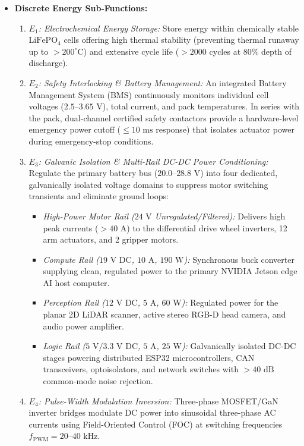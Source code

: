 \begin{itemize}[leftmargin=1.5em]
  \item \textbf{Discrete Energy Sub-Functions:}
  \begin{enumerate}[leftmargin=1.2em]
    \item \emph{$E_1$: Electrochemical Energy Storage:} Store energy within chemically stable $\text{LiFePO}_4$ cells offering high thermal stability (preventing thermal runaway up to $>200^\circ\text{C}$) and extensive cycle life ($>2000$ cycles at $80\%$ depth of discharge).
    \item \emph{$E_2$: Safety Interlocking \& Battery Management:} An integrated Battery Management System (BMS) continuously monitors individual cell voltages ($2.5\text{--}3.65\text{ V}$), total current, and pack temperatures. In series with the pack, dual-channel certified safety contactors provide a hardware-level emergency power cutoff ($\le 10\text{ ms}$ response) that isolates actuator power during emergency-stop conditions.
    \item \emph{$E_3$: Galvanic Isolation \& Multi-Rail DC-DC Power Conditioning:} Regulate the primary battery bus ($20.0\text{--}28.8\text{ V}$) into four dedicated, galvanically isolated voltage domains to suppress motor switching transients and eliminate ground loops:
    \begin{itemize}
      \item \emph{High-Power Motor Rail ($24\text{ V}$ Unregulated/Filtered):} Delivers high peak currents ($>40\text{ A}$) to the differential drive wheel inverters, 12 arm actuators, and 2 gripper motors.
      \item \emph{Compute Rail ($19\text{ V DC}$, $10\text{ A}$, $190\text{ W}$):} Synchronous buck converter supplying clean, regulated power to the primary NVIDIA Jetson edge AI host computer.
      \item \emph{Perception Rail ($12\text{ V DC}$, $5\text{ A}$, $60\text{ W}$):} Regulated power for the planar 2D LiDAR scanner, active stereo RGB-D head camera, and audio power amplifier.
      \item \emph{Logic Rail ($5\text{ V} / 3.3\text{ V DC}$, $5\text{ A}$, $25\text{ W}$):} Galvanically isolated DC-DC stages powering distributed ESP32 microcontrollers, CAN transceivers, optoisolators, and network switches with $>40\text{ dB}$ common-mode noise rejection.
    \end{itemize}
    \item \emph{$E_4$: Pulse-Width Modulation Inversion:} Three-phase MOSFET/GaN inverter bridges modulate DC power into sinusoidal three-phase AC currents using Field-Oriented Control (FOC) at switching frequencies $f_{\text{PWM}} = 20\text{--}40\text{ kHz}$.

\end{enumerate}
\end{itemize}
